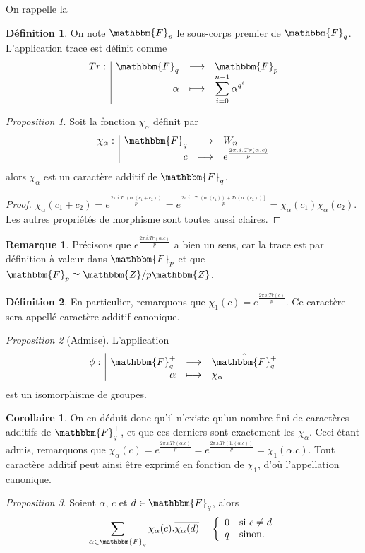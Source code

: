 \documentclass[12pt]{article}
\newcommand{\fonction}[5]{
\begin{displaymath}
\begin{array}{l|rcl}
\displaystyle
#1 : & #2 & \longrightarrow & #3 \\
    & #4 & \longmapsto & #5
\end{array}
\end{displaymath}
}
\theoremstyle{remark}\newtheorem{note}{Note}
\theoremstyle{remark}\newtheorem{nota}{Notation}
\newcommand{\Z}{\mathbbm{Z}}
\newcommand{\Fq}{\mathbbm{F}_q}
\newcommand{\Fp}{\mathbbm{F}_p}
\newtheorem{prop}{Proposition}
\theoremstyle{definition}
\newtheorem{definition}{Définition}
\newtheorem{coro}{Corollaire}
\newtheorem{rem}{Remarque}
\begin{document}
\pagebreak

On rappelle la 

\begin{definition}
On note $\Fp$ le sous-corps premier de $\Fq$. L'application trace est définit comme \fonction{Tr}{\Fq}{\Fp}{\alpha}{\displaystyle\sum_{i=0}^{n-1} \alpha^{q^i}}
\end{definition}

\begin{prop}
Soit la fonction $\chi_\alpha$ définit par \fonction{\chi_\alpha}{\Fq}{W_n}{c}{e^{\frac{2\pi.i.Tr(\alpha.c)}{p}}} alors $\chi_\alpha$ est un caractère additif de $\Fq$.
\end{prop}

\begin{proof}
$\chi_\alpha(c_1 + c_2) = e^{\frac{2\pi.i.Tr(\alpha.(c_1 + c_2))}{p}} = e^{\frac{2\pi.i.[Tr(\alpha.(c_1))+Tr(\alpha.(c_2))]}{p}}=\chi_\alpha(c_1)\chi_\alpha(c_2)$. Les autres propriétés de morphisme sont toutes aussi claires.
\end{proof}

\begin{rem}
Précisons que $e^{\frac{2\pi.i.Tr(\alpha.c)}{p}}$ a bien un sens, car la trace est par définition à valeur dans $\Fp$ et que $\Fp \simeq \Z / p\Z$.
\end{rem}

\begin{definition}
En particulier, remarquons que $\chi_1(c) = e^{\frac{2\pi.i.Tr(c)}{p}}$. Ce caractère sera appellé caractère additif canonique.
\end{definition}

\begin{prop}[Admise]
L'application \fonction{\phi}{\Fq^+}{\hat{\Fq^+}}{\alpha}{\chi_\alpha} est un isomorphisme de groupes.
\end{prop}

\begin{coro}
On en déduit donc qu'il n'existe qu'un nombre fini de caractères additifs de $\Fq^+$, et que ces derniers sont exactement les $\chi_\alpha$. Ceci étant admis, remarquons que $\chi_\alpha(c) = e^{\frac{2\pi.i.Tr(\alpha.c)}{p}} = e^{\frac{2\pi.i.Tr(1.(\alpha.c))}{p}} = \chi_1(\alpha.c)$. Tout caractère additif peut ainsi être exprimé en fonction de $\chi_1$, d'où l'appellation canonique.
\end{coro}

\begin{prop}
Soient $\alpha$, $c$ et $d \in \Fq$, alors
$$
\displaystyle\sum_{\alpha \in \Fq}\chi_\alpha(c).\overline{\chi_\alpha(d)} = \left\{
    \begin{array}{ll}
        0 & \mbox{si } c \ne d \\
        q & \mbox{sinon.}
    \end{array}
\right.
$$
\end{prop}
\end{document}
